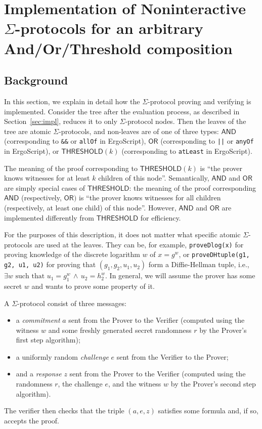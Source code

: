\documentclass[11pt]{article}
\newcommand{\langname}{ErgoScript\xspace}
\newcommand{\andnode}{\ensuremath{\mathsf{AND}}}
\newcommand{\ornode}{\ensuremath{\mathsf{OR}}}
\newcommand{\tnode}{\ensuremath{\mathsf{THRESHOLD}}}
\begin{document}





\appendix



\section{Implementation of Noninteractive $\Sigma$-protocols for an arbitrary And/Or/Threshold composition}
\label{app:crypto}
\subsection{Background}


In this section, we explain in detail how the $\Sigma$-protocol proving and verifying is implemented. Consider the tree after the evaluation process, as described in Section~\ref{sec:impl}, reduces it to only $\Sigma$-protocol nodes. Then the leaves of the tree are atomic $\Sigma$-protocols, and non-leaves are of one of three types: $\andnode$ (corresponding to \texttt{\&\&} or \texttt{allOf} in \langname), $\ornode$ (corresponding to \texttt{||} or \texttt{anyOf} in \langname), or $\tnode(k)$ (corresponding to \texttt{atLeast} in \langname). 

The meaning of the proof corresponding to $\tnode(k)$ is ``the prover knows witnesses for at least $k$ children of this node''. Semantically, $\andnode$ and $\ornode$ are simply special cases of $\tnode$: the meaning  of the proof corresponding $\andnode$ (respectively, $\ornode)$ is ``the prover knows witnesses for all children (respectively, at least one child) of this node''. However, $\andnode$ and $\ornode$ are implemented differently from $\tnode$ for efficiency.

For the purposes of this description, it does not matter what specific atomic $\Sigma$-protocols are used at the leaves. They can be, for example, \texttt{proveDlog(x)} for proving knowledge of the discrete logarithm $w$ of $x=g^w$, or \texttt{proveDHtuple(g1, g2, u1, u2)} for proving that $(g_1, g_2, u_1, u_2)$ form a Diffie-Hellman tuple, i.e., $\exists w \mbox{\ such\  that\ } u_1 = g_1^w \, \wedge \, u_2 = h_2^w$. In general, we will assume the prover has some secret $w$ and wants to prove some property of it. 

A $\Sigma$-protocol consist of three messages: 

\begin{itemize}
\item a \emph{commitment} $a$ sent from the Prover to the Verifier (computed using the witness $w$ and some freshly generated secret randomness $r$ by the Prover's first step algorithm);
\item a uniformly random \emph{challenge} $e$ sent from the Verifier to the Prover;
\item and a \emph{response} $z$ sent from the Prover to the Verifier (computed using the randomness $r$, the challenge $e$, and the witness $w$ by the Prover's second step algorithm). 
\end{itemize}
The verifier then checks that the triple $(a, e, z)$ satisfies some formula and, if so, accepts the proof.
\end{document}
